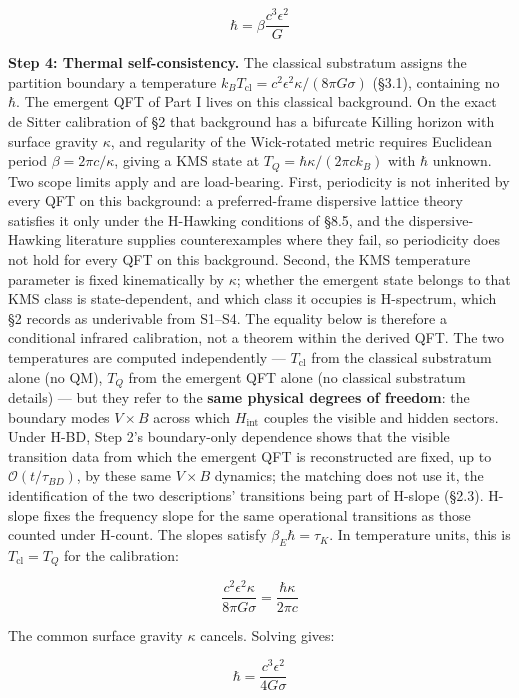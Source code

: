 \documentclass[
]{article}
\begin{document}
\[\hbar = \beta \frac{c^3 \epsilon^2}{G}\]

\textbf{Step 4: Thermal self-consistency.} The classical substratum
assigns the partition boundary a temperature
\(k_B T_{\text{cl}} = c^2 \epsilon^2 \kappa / (8\pi G \sigma)\) (§3.1),
containing no \(\hbar\). The emergent QFT of Part I lives on this
classical background. On the exact de Sitter calibration of §2 that
background has a bifurcate Killing horizon with surface gravity
\(\kappa\), and regularity of the Wick-rotated metric requires Euclidean
period \(\beta = 2\pi c/\kappa\), giving a KMS state at
\(T_Q = \hbar\kappa/(2\pi c k_B)\) with \(\hbar\) unknown. Two scope
limits apply and are load-bearing. First, periodicity is not inherited
by every QFT on this background: a preferred-frame dispersive lattice
theory satisfies it only under the H-Hawking conditions of §8.5, and the
dispersive-Hawking literature supplies counterexamples where they fail,
so periodicity does not hold for every QFT on this background. Second,
the KMS temperature parameter is fixed kinematically by \(\kappa\);
whether the emergent state belongs to that KMS class is state-dependent,
and which class it occupies is H-spectrum, which §2 records as
underivable from S1--S4. The equality below is therefore a conditional
infrared calibration, not a theorem within the derived QFT. The two
temperatures are computed independently --- \(T_{\text{cl}}\) from the
classical substratum alone (no QM), \(T_Q\) from the emergent QFT alone
(no classical substratum details) --- but they refer to the \textbf{same
physical degrees of freedom}: the boundary modes \(V \times B\) across
which \(H_{\text{int}}\) couples the visible and hidden sectors. Under
H-BD, Step 2's boundary-only dependence shows that the visible
transition data from which the emergent QFT is reconstructed are fixed,
up to \(\mathcal{O}(t/\tau_{BD})\), by these same \(V \times B\)
dynamics; the matching does not use it, the identification of the two
descriptions' transitions being part of H-slope (§2.3). H-slope fixes
the frequency slope for the same operational transitions as those
counted under H-count. The slopes satisfy \(\beta_E\hbar=\tau_K\). In
temperature units, this is \(T_{\text{cl}}=T_Q\) for the calibration:

\[\frac{c^2 \epsilon^2 \kappa}{8\pi G\sigma} = \frac{\hbar \kappa}{2\pi c}\]

The common surface gravity \(\kappa\) cancels. Solving gives:

\[\boxed{\hbar = \frac{c^3 \epsilon^2}{4G\sigma}}\]
\end{document}
